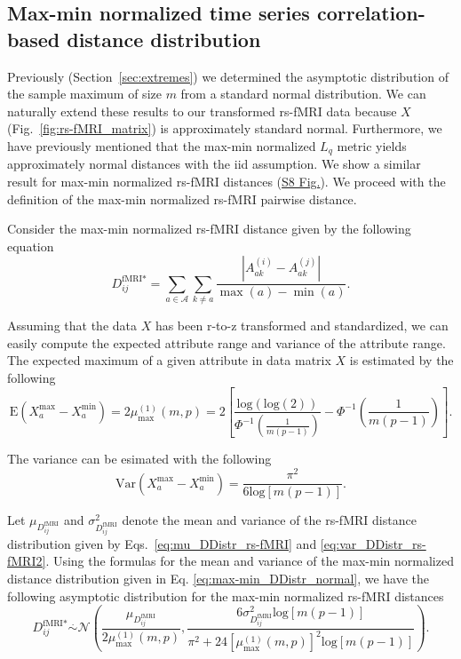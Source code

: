 \documentclass[10pt,letterpaper]{article}
\begin{document}
\subsection{Max-min normalized time series correlation-based distance distribution}

Previously (Section~\ref{sec:extremes}) we determined the asymptotic distribution of the sample maximum of size $m$ from a standard normal distribution. We can naturally extend these results to our transformed rs-fMRI data because $X$ (Fig.~\ref{fig:rs-fMRI_matrix}) is approximately standard normal. Furthermore, we have previously mentioned that the max-min normalized $L_q$ metric yields approximately normal distances with the iid assumption. We show a similar result for max-min normalized rs-fMRI distances (\hyperlink{S8_Fig}{S8 Fig.}). We proceed with the definition of the max-min normalized rs-fMRI pairwise distance.

Consider the max-min normalized rs-fMRI distance given by the following equation
%
\begin{equation}\label{eq:max-min_diff_rs-fMRI}
D^\text{fMRI*}_{ij} = \sum_{a \in \mathcal{A}} \sum_{k \neq a} \frac{\left|A^{(i)}_{ak} - A^{(j)}_{ak}\right|}{\max(a) - \min(a)}.
\end{equation}

Assuming that the data $X$ has been r-to-z transformed and standardized, we can easily compute the expected attribute range and variance of the attribute range. The expected maximum of a given attribute in data matrix $X$ is estimated by the following
%
\begin{equation}\label{eq:mean_max_rs-fMRI}
\text{E}\left(X^\text{max}_a - X^\text{min}_a\right) = 2\mu^{(1)}_\text{max}(m,p) = 2 \left[\frac{\text{log}(\text{log}(2))}{\Phi^{-1}\left(\frac{1}{m(p-1)}\right)} - \Phi^{-1}\left(\frac{1}{m(p-1)}\right)\right].
\end{equation}

The variance can be esimated with the following
%
\begin{equation}\label{eq:var_max_rs-fMRI}
\text{Var}\left(X^\text{max}_a - X^\text{min}_a\right) = \frac{\pi^2}{6\text{log}[m(p-1)]}.
\end{equation}

Let $\mu_{D^\text{fMRI}_{ij}}$ and $\sigma^2_{D^\text{fMRI}_{ij}}$ denote the mean and variance of the rs-fMRI distance distribution given by Eqs.~\ref{eq:mu_DDistr_rs-fMRI} and \ref{eq:var_DDistr_rs-fMRI2}. Using the formulas for the mean and variance of the max-min normalized distance distribution given in Eq. \ref{eq:max-min_DDistr_normal}, we have the following asymptotic distribution for the max-min normalized rs-fMRI distances
%
\begin{equation}\label{eq:max-min_DDistr_normal_rs-fMRI}
D^\text{fMRI*}_{ij} \overset{.}{\sim} \mathcal{N}\left(\frac{\mu_{D^\text{fMRI}_{ij}}}{2\mu^{(1)}_\text{max}(m,p)}, \frac{6\sigma^2_{D^\text{fMRI}_{ij}}\text{log}[m(p-1)]}{\pi^2 + 24\left[\mu^{(1)}_\text{max}(m,p)\right]^2\text{log}[m(p-1)]}\right).
\end{equation}
\end{document}
